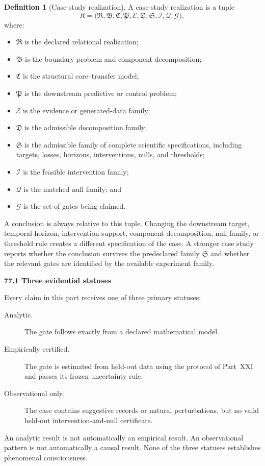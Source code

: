 \documentclass[11pt,letterpaper]{article}
\newcommand{\subtopic}[1]{%
 \vspace{0.45em}
 {\bfseries\color{AccentColor} #1\par}
}
\theoremstyle{plain}
\theoremstyle{definition}
\newtheorem{definition}[theorem]{Definition}
\begin{document}
\begin{definition}[Case-study realization]\label{def:case-study-realization}
A case-study realization is a tuple
\[
\mathfrak K
=
\bigl(
\mathfrak R,
\mathfrak B,
\mathfrak C,
\mathfrak P,
\mathcal E,
\mathfrak D,
\mathfrak S,
\mathcal I,
\mathcal Q,
\mathcal G
\bigr),
\]
where:
\begin{itemize}
\item \(\mathfrak R\) is the declared relational realization;
\item \(\mathfrak B\) is the boundary problem and component decomposition;
\item \(\mathfrak C\) is the structural core--transfer model;
\item \(\mathfrak P\) is the downstream predictive or control problem;
\item \(\mathcal E\) is the evidence or generated-data family;
\item \(\mathfrak D\) is the admissible decomposition family;
\item \(\mathfrak S\) is the admissible family of complete scientific
 specifications, including targets, losses, horizons, interventions, nulls,
 and thresholds;
\item \(\mathcal I\) is the feasible intervention family;
\item \(\mathcal Q\) is the matched null family; and
\item \(\mathcal G\) is the set of gates being claimed.
\end{itemize}
A conclusion is always relative to this tuple. Changing the downstream target,
temporal horizon, intervention support, component decomposition, null family,
or threshold rule creates a different specification of the case. A stronger
case study reports whether the conclusion survives the predeclared family
\(\mathfrak S\) and whether the relevant gates are identified by the available
experiment family.
\end{definition}

\subtopic{77.1 Three evidential statuses}

Every claim in this part receives one of three primary statuses:
\begin{description}
\item[Analytic.] The gate follows exactly from a declared mathematical model.
\item[Empirically certified.] The gate is estimated from held-out data using
 the protocol of Part~XXI and passes its frozen uncertainty rule.
\item[Observational only.] The case contains suggestive records or natural
 perturbations, but no valid held-out intervention-and-null certificate.
\end{description}
An analytic result is not automatically an empirical result. An observational
pattern is not automatically a causal result. None of the three statuses
establishes phenomenal consciousness.
\end{document}
